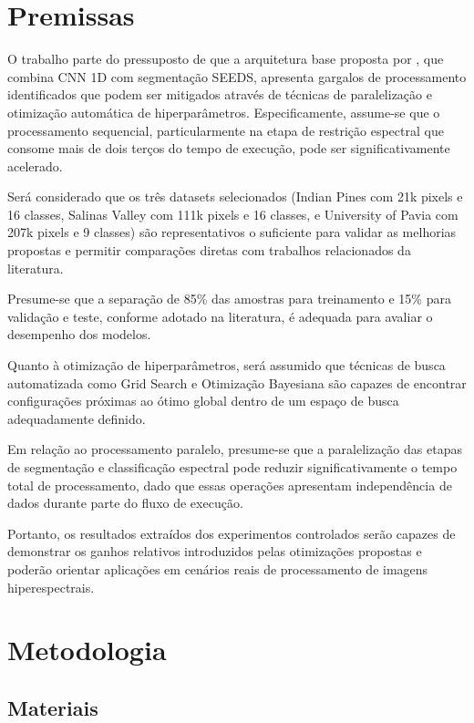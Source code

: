 \section{Premissas}

O trabalho parte do pressuposto de que a arquitetura base proposta por \cite{Souza2023}, que combina CNN 1D com segmentação SEEDS, apresenta gargalos de processamento identificados que podem ser mitigados através de técnicas de paralelização e otimização automática de hiperparâmetros. Especificamente, assume-se que o processamento sequencial, particularmente na etapa de restrição espectral que consome mais de dois terços do tempo de execução, pode ser significativamente acelerado.

Será considerado que os três datasets selecionados (Indian Pines com 21k pixels e 16 classes, Salinas Valley com 111k pixels e 16 classes, e University of Pavia com 207k pixels e 9 classes) são representativos o suficiente para validar as melhorias propostas e permitir comparações diretas com trabalhos relacionados da literatura.

Presume-se que a separação de 85\% das amostras para treinamento e 15\% para validação e teste, conforme adotado na literatura, é adequada para avaliar o desempenho dos modelos.

Quanto à otimização de hiperparâmetros, será assumido que técnicas de busca automatizada como Grid Search e Otimização Bayesiana são capazes de encontrar configurações próximas ao ótimo global dentro de um espaço de busca adequadamente definido.

Em relação ao processamento paralelo, presume-se que a paralelização das etapas de segmentação e classificação espectral pode reduzir significativamente o tempo total de processamento, dado que essas operações apresentam independência de dados durante parte do fluxo de execução.

Portanto, os resultados extraídos dos experimentos controlados serão capazes de demonstrar os ganhos relativos introduzidos pelas otimizações propostas e poderão orientar aplicações em cenários reais de processamento de imagens hiperespectrais.

\section{Metodologia}

\subsection{Materiais}

